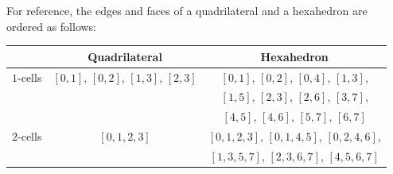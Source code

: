 For reference, the edges and faces of a quadrilateral and a hexahedron are ordered as follows:
\begin{center}
 \begin{tabular}{|l|c|c|}
  \hline
              & Quadrilateral                      & Hexahedron   \\
  \hline
   $1$-cells  & $[0,1]$, $[0,2]$, $[1,3]$, $[2,3]$ & $[0,1]$, $[0,2]$, $[0,4]$, $[1,3]$, \\
              &                                    & $[1,5]$, $[2,3]$, $[2,6]$, $[3,7]$, \\
              &                                    & $[4,5]$, $[4,6]$, $[5,7]$, $[6,7]$ \\
  \hline
   $2$-cells  & $[0,1,2,3]$                        & $[0,1,2,3]$, $[0,1,4,5]$, $[0,2,4,6]$, \\
              &                                    & $[1,3,5,7]$, $[2,3,6,7]$, $[4,5,6,7]$ \\
  \hline
 \end{tabular}

\end{center}


